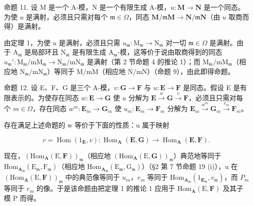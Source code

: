 命题 11. 设 M 是一个 A-模，N 是一个有限生成 A-模，\(u: \mathbf{M} \to \mathbf{N}\) 是一个同态。为使 \(u\) 是满射，必须且只需对每个 \(\mathfrak{m} \in \Omega\)，同态 \(\mathbf{M} / \mathfrak{m}\mathbf{M} \to \mathbf{N} / \mathfrak{m}\mathbf{N}\)（由 \(u\) 取商而得）是满射。

由定理 1，为使 \(u\) 是满射，必须且只需 \(u_{\mathfrak{m}}: \mathrm{M}_{\mathfrak{m}} \to \mathrm{N}_{\mathfrak{m}}\) 对一切 \(\mathfrak{m} \in \Omega\) 是满射。由于 \(\mathrm{A}_{\mathfrak{m}}\) 是局部环且 \(\mathrm{N}_{\mathfrak{m}}\) 是有限生成 \(\mathrm{A}_{\mathfrak{m}}\)-模，这等价于说由取商得到的同态 \(u_{\mathfrak{m}}': \mathrm{M}_{\mathfrak{m}} / \mathrm{mM}_{\mathfrak{m}} \to \mathrm{N}_{\mathfrak{m}} / \mathrm{mN}_{\mathfrak{m}}\) 是满射（第 2 节命题 4 的推论 1）；而 \(\mathrm{M}_{\mathfrak{m}} / \mathrm{mM}_{\mathfrak{m}}\)（相应地 \(\mathrm{N}_{\mathfrak{m}} / \mathrm{mN}_{\mathfrak{m}}\)）等同于 \(\mathrm{M} / \mathrm{mM}\)（相应地 \(\mathrm{N} / \mathrm{mN}\)）（命题 9），由此即得命题。

命题 12. 设 E、F、G 是三个 A-模，\(v: \mathbf{G} \to \mathbf{F}\) 与 \(u: \mathbf{E} \to \mathbf{F}\) 是同态。假设 E 是有限表示的。为使存在同态 \(w: \mathbf{E} \to \mathbf{G}\) 使 \(u\) 分解为 \(\mathbf{E} \xrightarrow{w} \mathbf{G} \xrightarrow{v} \mathbf{F}\)，必须且只需对每个 \(m \in \Omega\)，存在同态 \(w^m: \mathbf{E}_m \to \mathbf{G}_m\) 使 \(u_m: \mathbf{E}_m \to \mathbf{F}_m\) 分解为 \(\mathbf{E}_m \xrightarrow{w^m} \mathbf{G}_m \xrightarrow{v_m} \mathbf{F}_m\)。

存在满足上述命题的 w 等价于下面的性质：u 属于映射

\[
r = \operatorname{Hom} (1 _ {\mathbf {E}}, v): \operatorname{Hom} _ {\mathbf {A}} (\mathbf {E}, \mathbf {G}) \rightarrow \operatorname{Hom} _ {\mathbf {A}} (\mathbf {E}, \mathbf {F}).
\]

现在，\((\mathrm{Hom}_{\mathbf{A}}(\mathrm{E},\mathbf{F}))_{\mathfrak{m}}\)（相应地 \((\mathrm{Hom}_{\mathbf{A}}(\mathrm{E},\mathbf{G}))_{\mathfrak{m}}\)）典范地等同于 \(\mathrm{Hom}_{\mathbf{A}_{\mathfrak{m}}}(\mathrm{E}_{\mathfrak{m}},\mathrm{F}_{\mathfrak{m}})\)（相应地 \(\mathrm{Hom}_{\mathbf{A}_{\mathfrak{m}}}(\mathrm{E}_{\mathfrak{m}},\mathrm{G}_{\mathfrak{m}})\)）（§2 第 7 节命题 19 (i)），u 在 \((\mathrm{Hom}_{\mathbf{A}}(\mathrm{E},\mathbf{F}))_{\mathfrak{m}}\) 中的典范像等同于 \(u_{m}\)，\(r_{m}\) 等同于 \(\mathrm{Hom}_{\mathbf{A}_{\mathfrak{m}}}(1_{\mathbf{E}_{\mathfrak{m}}},v_{\mathfrak{m}})\)，而 \(P_{m}\) 等同于 \(r_{m}\) 的像。于是该命题由把定理 1 的推论 1 应用于 \(\mathrm{Hom}_{\mathbf{A}}(\mathrm{E},\mathbf{F})\) 及其子模 P 而得。

